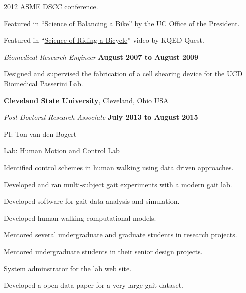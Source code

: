 \documentclass[10pt]{article}
\newenvironment{outerlist}[1][\enskip\textbullet]%
        {\begin{itemize}[#1]}{\end{itemize}%
         \vspace{-.6\baselineskip}}
\newenvironment{innerlist}[1][\enskip\textbullet]%
        {\begin{compactitem}[#1]}{\end{compactitem}}
\newcommand{\blankline}{\quad\pagebreak[2]}
\begin{document}
\begin{outerlist}
\begin{innerlist}
      2012 ASME DSCC conference.
    \item Featured in ``\href{http://youtu.be/HcYbn_RCLiw}{Science of
      Balancing a Bike}'' by the UC Office of the President.
    \item Featured in ``\href{http://youtu.be/zShn5xMueso}{Science of Riding a
      Bicycle}'' video by KQED Quest.
  \end{innerlist}
  \item[] \textit{Biomedical Research Engineer}%
        \hfill \textbf{August 2007 to August 2009}
  \begin{innerlist}
    \item Designed and supervised the fabrication of a cell shearing device for
      the UCD Biomedical Passerini Lab.
  \end{innerlist}
\end{outerlist}

\blankline

\href{http://csuohio.edu}{\textbf{Cleveland State University}}, Cleveland, Ohio USA
\begin{outerlist}
  \item[] \textit{Post Doctoral Research Associate}
    \hfill \textbf{July 2013 to August 2015}
  \begin{innerlist}
    \item PI: Ton van den Bogert
    \item Lab: Human Motion and Control Lab
    \item Identified control schemes in human walking using data driven
      approaches.
    \item Developed and ran multi-subject gait experiments with a modern gait
      lab.
    \item Developed software for gait data analysis and simulation.
    \item Developed human walking computational models.
    \item Mentored several undergraduate and graduate students in research
      projects.
    \item Mentored undergraduate students in their senior design projects.
    \item System adminstrator for the lab web site.
    \item Developed a open data paper for a very large gait dataset.
  \end{innerlist}
\end{outerlist}

\blankline
\end{document}
